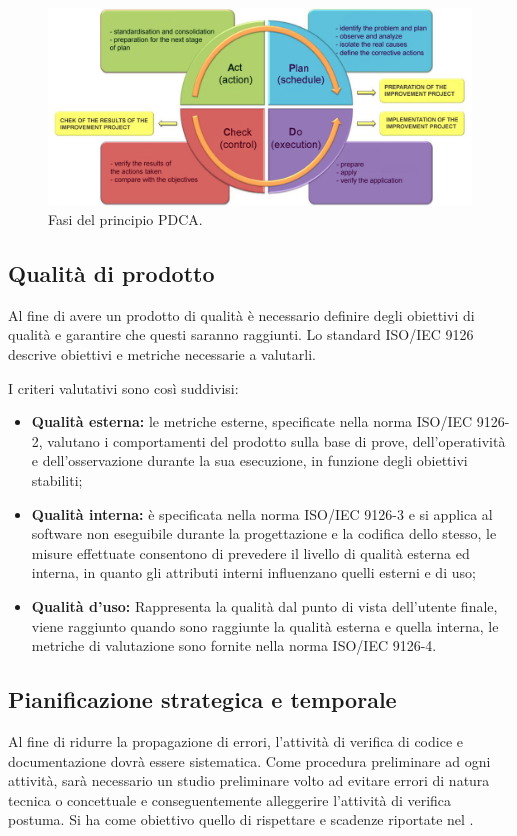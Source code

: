 	\begin{figure}[H]
		\centering
		\includegraphics[scale=0.6]{includes/img/pdca.png}
		\caption{Fasi del principio PDCA.}
	\end{figure}
	
	\subsection{Qualità di prodotto}
	Al fine di avere un prodotto di qualità è necessario definire degli obiettivi di qualità e garantire che questi saranno raggiunti. 
	Lo standard ISO/IEC 9126 descrive obiettivi e metriche necessarie a valutarli.
	
	I criteri valutativi sono così suddivisi:
	
	\begin{itemize}
		\item \textbf{Qualità esterna: }le metriche esterne, specificate nella norma ISO/IEC 9126-2, valutano i comportamenti del prodotto sulla base di prove, dell'operatività e dell'osservazione durante la sua esecuzione, in funzione degli obiettivi stabiliti;
		\item \textbf{Qualità interna: }è specificata nella norma ISO/IEC 9126-3 e si applica al software non eseguibile
		durante la progettazione e la codifica dello stesso, le misure effettuate consentono di prevedere il livello di qualità esterna ed interna, in quanto gli attributi interni influenzano quelli esterni e di uso;
		\item \textbf{Qualità d'uso: }Rappresenta la qualità dal punto di vista dell'utente finale, viene raggiunto quando sono raggiunte la qualità esterna e quella interna, le metriche di valutazione sono fornite nella norma ISO/IEC 9126-4.
	\end{itemize}
	
	
	\subsection{Pianificazione strategica e temporale}
	Al fine di ridurre la propagazione di errori, l’attività di verifica di codice e documentazione dovrà essere sistematica. 
	Come procedura preliminare ad ogni attività, sarà necessario un studio preliminare volto ad evitare errori di natura tecnica o concettuale e conseguentemente alleggerire l’attività di verifica postuma.
	Si ha come obiettivo quello di rispettare e scadenze riportate nel \PdP.
	
